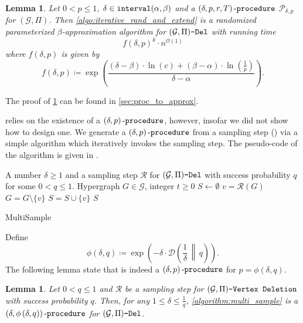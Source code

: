 \documentclass[letterpaper,11pt]{article}
\newcommand{\abs}[1]{{\left| #1\right|}}
\newcommand{\1}[1]{\mathds{1}\left[#1\right]}
\newcommand{\D}[2]{\mathcal{D}\left(#1\, \middle\|\,#2 \right)}
\newcommand{\Oh}{\mathcal{O}}
\newcommand{\goodd}{\textnormal{\texttt{interval}}(\alpha, \beta)}
\newcommand{\procext}[4]{\left( #1, #2, #3, #4 \right)\textnormal{-\texttt{procedure}}}
\newcommand{\proc}[2]{\left( #1, #2 \right)\textnormal{-\texttt{procedure}}}
\newcommand{\procalg}[2]{\mathcal{P}_{#1,#2}}
\newtheorem{lemma}[theorem]{Lemma}
\newcommand{\gpivd}[1][\mathcal{G},\Pi]{(#1)\textnormal{\texttt{-Vertex Deletion}}}
\newcommand{\sgpivd}[1][\mathcal{G},\Pi]{(#1)\textnormal{\texttt{-Del}}}
\begin{document}
\begin{lemma}\label{lemma:beta_approx}
	Let $0 < p \leq 1$, $\delta \in \goodd$ and a $\procext{\delta}{p}{r}{T}$ $\procalg{\delta}{p}$ for $(\mathcal{G}, \Pi)$.
	Then \cref{algo:iterative_rand_and_extend} is a randomized parameterized $\beta$-approximation algorithm for $\sgpivd$ with running time
	\begin{equation*}
		f\left( \delta, p \right) ^{k} \cdot n^{\Oh(1)}
	\end{equation*}
	where $f(\delta,p)$ is given by 
	\begin{equation*}
		f(\delta, p) \coloneqq  \exp\left( \frac{(\delta - \beta) \cdot \ln(c) + (\beta - \alpha) \cdot \ln\left( \frac{1}{p} \right) }{\delta - \alpha} \right).
	\end{equation*}
\end{lemma}

The proof of \cref{lemma:beta_approx} can be found in \cref{sec:proc_to_approx}.




 relies on the existence of a $\proc{\delta}{p}$, however, insofar we did not show how to design one. 
We generate a $\proc{\delta}{p}$ from a sampling step () via a simple algorithm which iteratively invokes the sampling step. The pseudo-code of  the algorithm is given in . 


\begin{algorithm}
	\begin{algorithmic}[1]
		\Configuration A number $\delta \geq 1$ and a sampling step $\mathcal{R}$ for $\sgpivd$ with success probability $q$ for some $0 < q \leq 1$.		
		\Input Hypergraph $G \in \mathcal{G}$, integer $t \geq 0$ 
		\State $S \gets \emptyset$		
		\While{$\abs{S} < \delta \cdot t$ and $G \not\in \Pi$}
		\State $ v = \mathcal{R}\left(G\right) $\label{line:v_multi_sample}
		\State $G = G \setminus \{v\}$
		\State $S = S \cup \{v\} $		
		\EndWhile
		\State \Return $S$
	\end{algorithmic}
	\caption{MultiSample}\label{algorithm:multi_sample}
\end{algorithm}

Define
\begin{equation}\label{eq:def_p_delta_q}
	\phi(\delta, q) \coloneqq \exp\left( -\delta \cdot \D{\frac{1}{\delta}}{q} \right).
\end{equation}
The following lemma state that  is indeed a $\proc{\delta}{p}$ for $p = \phi(\delta,q)$. 
\begin{lemma}\label{lemma:multi_step_proc}
	Let $0 < q \leq 1$ and $\mathcal{R}$ be a sampling step for $\gpivd$ with success
	probability $q$. Then, for any $1 \leq \delta \leq \frac{1}{q}$, \cref{algorithm:multi_sample}
	is a $\proc{\delta}{\phi\left( \delta, q \right) }$ for $\sgpivd$.
\end{lemma}
\end{document}
